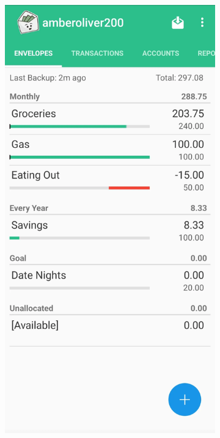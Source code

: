\documentclass{l4proj}
\begin{document}
\begin{appendices}
\begin{figure}[h]
    \centering
    \begin{subfigure}[t]{0.25\textwidth}
        \vspace{0pt}
        \includegraphics[width=\textwidth]{images/App-Comparison/goodbudget-ss-2.png}

\end{subfigure}
\end{figure}
\end{appendices}
\end{document}
